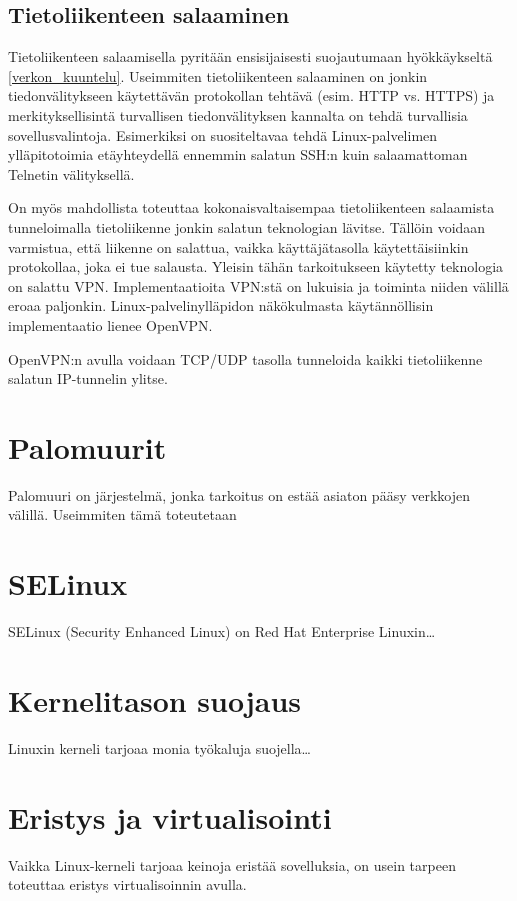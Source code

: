 \subsection{Tietoliikenteen salaaminen}\label{tietoliikenteen_salaaminen}

Tietoliikenteen salaamisella pyritään ensisijaisesti suojautumaan hyökkäykseltä \ref{verkon_kuuntelu}. Useimmiten tietoliikenteen salaaminen on jonkin tiedonvälitykseen käytettävän protokollan tehtävä (esim. HTTP vs. HTTPS) ja merkityksellisintä turvallisen tiedonvälityksen kannalta on tehdä turvallisia sovellusvalintoja. Esimerkiksi on suositeltavaa tehdä Linux-palvelimen ylläpitotoimia etäyhteydellä ennemmin salatun SSH:n kuin salaamattoman Telnetin välityksellä.

On myös mahdollista toteuttaa kokonaisvaltaisempaa tietoliikenteen salaamista tunneloimalla tietoliikenne jonkin salatun teknologian lävitse. Tällöin voidaan varmistua, että liikenne on salattua, vaikka käyttäjätasolla käytettäisiinkin protokollaa, joka ei tue salausta. Yleisin tähän tarkoitukseen käytetty teknologia on salattu VPN. Implementaatioita VPN:stä on lukuisia ja toiminta niiden välillä eroaa paljonkin. Linux-palvelinylläpidon näkökulmasta käytännöllisin implementaatio lienee OpenVPN.

OpenVPN:n avulla voidaan TCP/UDP tasolla tunneloida kaikki tietoliikenne salatun IP-tunnelin ylitse.

\section{Palomuurit}\label{palomuurit}
Palomuuri on järjestelmä, jonka tarkoitus on estää asiaton pääsy verkkojen välillä. Useimmiten tämä toteutetaan

\section{SELinux}\label{selinux}
SELinux (Security Enhanced Linux) on Red Hat Enterprise Linuxin\ldots

\section{Kernelitason suojaus}\label{kernelitason_suojaus}
Linuxin kerneli tarjoaa monia työkaluja suojella\ldots 

\section{Eristys ja virtualisointi}\label{eristys_ja_virtualisointi}
Vaikka Linux-kerneli tarjoaa keinoja eristää sovelluksia, on usein tarpeen toteuttaa eristys virtualisoinnin avulla.

